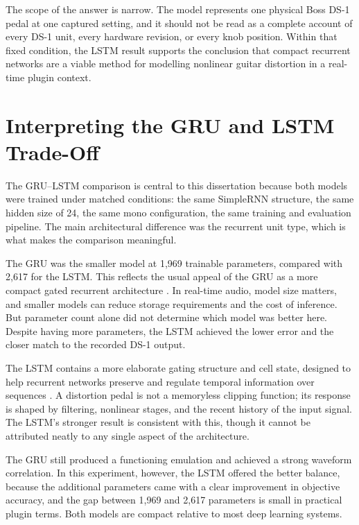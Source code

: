 The scope of the answer is narrow. The model represents one physical Boss DS-1 pedal at one captured setting, and it should not be read as a complete account of every DS-1 unit, every hardware revision, or every knob position. Within that fixed condition, the LSTM result supports the conclusion that compact recurrent networks are a viable method for modelling nonlinear guitar distortion in a real-time plugin context.

\section{Interpreting the GRU and LSTM Trade-Off}

The GRU--LSTM comparison is central to this dissertation because both models were trained under matched conditions: the same SimpleRNN structure, the same hidden size of 24, the same mono configuration, the same training and evaluation pipeline. The main architectural difference was the recurrent unit type, which is what makes the comparison meaningful.

The GRU was the smaller model at 1,969 trainable parameters, compared with 2,617 for the LSTM. This reflects the usual appeal of the GRU as a more compact gated recurrent architecture \cite{cho_learning_2014}. In real-time audio, model size matters, and smaller models can reduce storage requirements and the cost of inference. But parameter count alone did not determine which model was better here. Despite having more parameters, the LSTM achieved the lower error and the closer match to the recorded DS-1 output.

The LSTM contains a more elaborate gating structure and cell state, designed to help recurrent networks preserve and regulate temporal information over sequences \cite{hochreiter_long_1997}. A distortion pedal is not a memoryless clipping function; its response is shaped by filtering, nonlinear stages, and the recent history of the input signal. The LSTM's stronger result is consistent with this, though it cannot be attributed neatly to any single aspect of the architecture.

The GRU still produced a functioning emulation and achieved a strong waveform correlation. In this experiment, however, the LSTM offered the better balance, because the additional parameters came with a clear improvement in objective accuracy, and the gap between 1,969 and 2,617 parameters is small in practical plugin terms. Both models are compact relative to most deep learning systems.

